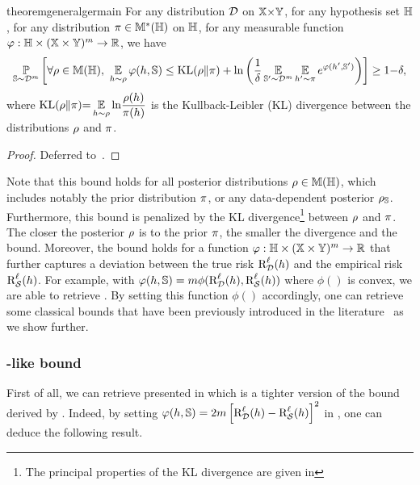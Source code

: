 \begin{restatable}{theorem}{generalgermain}\label{chap:pac-bayes:theorem:general-germain}
For any distribution $\D$ on $\X{\times}\Y$, for any hypothesis set $\H$, for any distribution $\P\in\M^{*}(\H)$ on $\H$, for any measurable function $\varphi: \H\times(\X\times\Y)^\m\to \Rbb$, we have
\begin{align*}
    \PP_{\S\sim\D^\m}\LB \forall\Q\in\M(\H),\  \EE_{\h\sim\Q}\varphi(\h, \S) \le \KL(\Q\|\P) + \ln\LP\frac{1}{\delta}\EE_{\S'\sim\D^\m}\EE_{\h'\sim\P}e^{\varphi(\h', \S')}\RP \RB\ge1{-}\delta,
\end{align*}
where $\displaystyle\KL(\Q\|\P){=}\EE_{\h\sim\Q}\ln\!\frac{\Q(\h)}{\P(\h)}$ is the Kullback-Leibler (KL) divergence between the distributions $\Q$ and $\P$.
\end{restatable}
\begin{noaddcontents}\begin{proof}
Deferred to~.
\end{proof}\end{noaddcontents}

Note that this bound holds for all posterior distributions $\Q\in\M(\H)$, which includes notably the prior distribution $\P$, or any data-dependent posterior $\AQ$.
Furthermore, this bound is penalized by the KL divergence\footnote{The principal properties of the KL divergence are given in } between $\Q$ and $\P$. 
The closer the posterior $\Q$ is to the prior $\P$, the smaller the divergence and the bound.
Moreover, the bound holds for a function $\varphi: \H\times(\X\times\Y)^\m\to \Rbb$ that further captures a deviation between the true risk $\RiskLoss_{\D}(\h)$ and the empirical risk $\RiskLoss_{\dS}(\h)$.
For example, with $\varphi(\h,\S)=\m\phi(\RiskLoss_{\D}(\h),\RiskLoss_{\dS}(\h))$ where $\phi()$ is convex, we are able to retrieve . 
By setting this function $\phi()$ accordingly, one can retrieve some classical bounds that have been previously introduced in the literature~\citep{McAllester2003,Seeger2002,Catoni2007} as we show further.

\subsubsection{\citeauthor{McAllester2003}-like bound}

First of all, we can retrieve  presented in  which is a tighter version of the bound derived by \citet[Theorem~1]{McAllester2003}.
Indeed, by setting $\varphi(\h,\S)=2\m\LB\RiskLoss_{\D}(\h)-\RiskLoss_{\dS}(\h)\RB^2$ in , one can deduce the following result.

